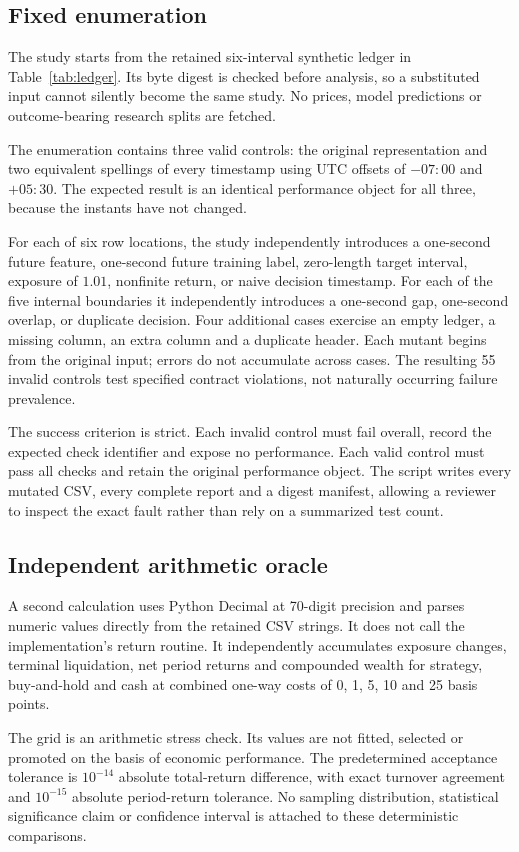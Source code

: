 \documentclass[sigconf,anonymous,nonacm]{acmart}
\begin{document}
\subsection{Fixed enumeration}
The study starts from the retained six-interval synthetic ledger in Table~\ref{tab:ledger}. Its byte digest is checked before analysis, so a substituted input cannot silently become the same study. No prices, model predictions or outcome-bearing research splits are fetched.

The enumeration contains three valid controls: the original representation and two equivalent spellings of every timestamp using UTC offsets of $-07{:}00$ and $+05{:}30$. The expected result is an identical performance object for all three, because the instants have not changed.

For each of six row locations, the study independently introduces a one-second future feature, one-second future training label, zero-length target interval, exposure of $1.01$, nonfinite return, or naive decision timestamp. For each of the five internal boundaries it independently introduces a one-second gap, one-second overlap, or duplicate decision. Four additional cases exercise an empty ledger, a missing column, an extra column and a duplicate header. Each mutant begins from the original input; errors do not accumulate across cases. The resulting 55 invalid controls test specified contract violations, not naturally occurring failure prevalence.

The success criterion is strict. Each invalid control must fail overall, record the expected check identifier and expose no performance. Each valid control must pass all checks and retain the original performance object. The script writes every mutated CSV, every complete report and a digest manifest, allowing a reviewer to inspect the exact fault rather than rely on a summarized test count.

\subsection{Independent arithmetic oracle}
A second calculation uses Python Decimal at 70-digit precision and parses numeric values directly from the retained CSV strings. It does not call the implementation's return routine. It independently accumulates exposure changes, terminal liquidation, net period returns and compounded wealth for strategy, buy-and-hold and cash at combined one-way costs of 0, 1, 5, 10 and 25 basis points.

The grid is an arithmetic stress check. Its values are not fitted, selected or promoted on the basis of economic performance. The predetermined acceptance tolerance is $10^{-14}$ absolute total-return difference, with exact turnover agreement and $10^{-15}$ absolute period-return tolerance. No sampling distribution, statistical significance claim or confidence interval is attached to these deterministic comparisons.
\end{document}
